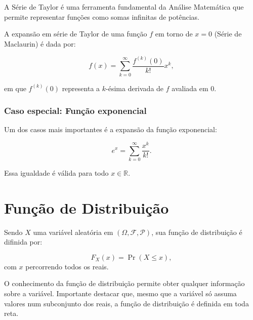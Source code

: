 \documentclass[
  letterpaper,
  DIV=11,
  numbers=noendperiod]{scrreprt}
\begin{document}
A Série de Taylor é uma ferramenta fundamental da Análise Matemática que
permite representar funções como somas infinitas de potências.

\begin{tcolorbox}[enhanced jigsaw, colback=white, leftrule=.75mm, colbacktitle=quarto-callout-warning-color!10!white, breakable, titlerule=0mm, bottomtitle=1mm, title=\textcolor{quarto-callout-warning-color}{\faExclamationTriangle}\hspace{0.5em}{Definição:}, colframe=quarto-callout-warning-color-frame, toprule=.15mm, opacityback=0, bottomrule=.15mm, opacitybacktitle=0.6, arc=.35mm, toptitle=1mm, rightrule=.15mm, coltitle=black, left=2mm]

A expansão em série de Taylor de uma função \(f\) em torno de \(x = 0\)
(Série de Maclaurin) é dada por:

\[f(x) = \sum_{k=0}^{\infty} \frac{f^{(k)}(0)}{k!} x^k,\]

em que \(f^{(k)}(0)\) representa a \(k\)-ésima derivada de \(f\)
avaliada em 0.

\end{tcolorbox}

\subsubsection{Caso especial: Função
exponencial}\label{caso-especial-funuxe7uxe3o-exponencial}

Um dos casos mais importantes é a expansão da função exponencial:

\[e^x = \sum_{k=0}^{\infty} \frac{x^k}{k!}.\]

Essa igualdade é válida para todo \(x \in \mathbb{R}\).

\section{Função de
Distribuição}\label{funuxe7uxe3o-de-distribuiuxe7uxe3o}

Sendo \(X\) uma variável aleatória em
\((\Omega, \mathcal{F}, \mathcal{P})\), sua função de distribuição é
difinida por:

\[F_X(x) = \Pr(X \leq x),\] com \(x\) percorrendo todos os reais.

O conhecimento da função de distribuição permite obter qualquer
informação sobre a variável. Importante destacar que, mesmo que a
variável só assuma valores num subconjunto dos reais, a função de
distribuição é definida em toda reta.
\end{document}
